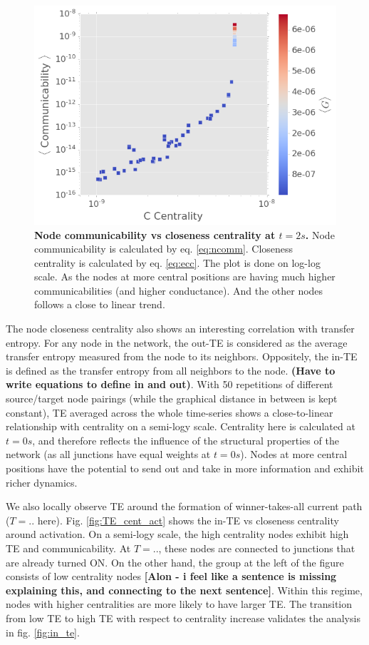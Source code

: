 \documentclass[%
 reprint,
 amsmath,amssymb,
 aps,
floatfix,
]{revtex4-2}
\begin{document}
\begin{figure}[h]
	\centering
	\includegraphics[width=1\linewidth]{figure/comm_cent}
	\caption{\textbf{Node communicability vs closeness centrality at $t = 2 s$.} Node communicability is calculated by eq. \ref{eq:ncomm}. Closeness centrality is calculated by eq. \ref{eq:ecc}. The plot is done on log-log scale. As the nodes at more central positions are having much higher communicabilities (and higher conductance). And the other nodes follows a close to linear trend.}
	\label{fig:comm_cent}
\end{figure}

The node closeness centrality also shows an interesting correlation with transfer entropy. For any node in the network, the out-TE is considered as the average transfer entropy measured from the node to its neighbors. Oppositely, the in-TE is defined as the transfer entropy from all neighbors to the node. \textbf{(Have to write equations to define in and out)}. With 50 repetitions of different source/target node pairings (while the graphical distance in between is kept constant), TE averaged across the whole time-series shows a close-to-linear relationship with centrality on a semi-logy scale. Centrality here is calculated at $t = 0s$, and therefore reflects the influence of the structural properties of the network (as all junctions have equal weights at $t = 0s$). Nodes at more central positions have the potential to send out and take in more information and exhibit richer dynamics.

We also locally observe TE around the formation of winner-takes-all current path ($T = ..$ here). 
Fig. \ref{fig:TE_cent_act} shows the in-TE vs closeness centrality around activation. On a semi-logy scale, the high centrality nodes exhibit high TE and communicability. At $T = ..$, these nodes are connected to junctions that are already turned ON. On the other hand, the group at the left of the figure consists of low centrality nodes \textbf{[Alon - i feel like a sentence is missing explaining this, and connecting to the next sentence]}. Within this regime, nodes with higher centralities are more likely to have larger TE. The transition from low TE to high TE with respect to centrality increase validates the analysis in fig. \ref{fig:in_te}.
\end{document}
